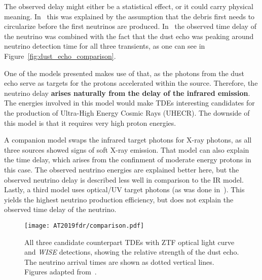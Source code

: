 The observed delay might either be a statistical effect, or it could carry physical meaning. In~\cite{Velzen2021} this was explained by the assumption that the debris first needs to circularize before the first neutrinos are produced. In~ the observed time delay of the neutrino was combined with the fact that the dust echo was peaking around neutrino detection time for all three transients, as one can see in Figure~\ref{fig:dust_echo_comparison}.

One of the models presented makes use of that, as the photons from the dust echo serve as targets for the protons accelerated within the source. Therefore, the neutrino delay \textbf{arises naturally from the delay of the infrared emission}. The energies involved in this model would make TDEs interesting candidates for the production of Ultra-High Energy Cosmic Rays (UHECR). The downside of this model is that it requires very high proton energies.

A companion model swaps the infrared target photons for X-ray photons, as all three sources showed signs of soft X-ray emission. That model can also explain the time delay, which arises from the confinment of moderate energy protons in this case. The observed neutrino energies are explained better here, but the observed neutrino delay is described less well in comparison to the IR model. Lastly, a third model uses optical/UV target photons (as was done in~\cite{Velzen2021}). This yields the highest neutrino production efficiency, but does not explain the observed time delay of the neutrino.

\begin{figure*}[htb]
    \texttt{[image: AT2019fdr/comparison.pdf]}
    \caption[All candidate counterparts in comparison]{All three candidate counterpart TDEs with ZTF optical light curve and \textit{WISE} detections, showing the relative strength of the dust echo. The neutrino arrival times are shown as dotted vertical lines. Figures adapted from~\cite{Velzen2021}.}
\end{figure*}